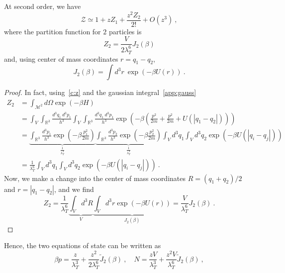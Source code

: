     At second order, we have 
    \begin{equation*}
        \mathcal Z \simeq 1 + z Z_1 + \frac{z^2 Z_2}{2!} + O(z^3) ~,
    \end{equation*}
    where the partition function for $2$ particles is 
    \begin{equation*}
        Z_2 = \frac{V}{2 \lambda_T^6} J_2 (\beta) 
    \end{equation*}
    and, using center of mass coordinates $r = q_1 - q_2$,
    \begin{equation*}
        J_2 (\beta) = \int d^3 r ~ \exp(- \beta U(r)) ~.
    \end{equation*}
    \begin{proof}
        In fact, using~\eqref{c:z} and the gaussian integral~\eqref{app:gauss}
        \begin{equation*}
        \begin{aligned}
            Z_2 & = \int_{\mathcal M^2} d \Omega \exp(- \beta H) \\ & = \int_V \int_{\mathbb R^3}\frac{d^3 q_1 ~ d^3 p_1}{h^3} \int_V \int_{\mathbb R^3}\frac{d^3 q_1 ~ d^3 p_1}{h^3} \exp(- \beta (\frac{p^2}{2m} + \frac{p^2}{2m} + U(|q_1 - q_2|))) \\ & = \underbrace{\int_{\mathbb R^3} \frac{d^3 p_1}{h^3} \exp(- \beta \frac{p_1^2}{2m})}_{\frac{1}{\lambda_T^3}} \underbrace{\int_{\mathbb R^3} \frac{d^3 p_2}{h^3} \exp(- \beta \frac{p_2^2}{2m})}_{\frac{1}{\lambda_T^3}} \int_V d^3 q_1 \int_V d^3 q_2 \exp(- \beta U(|q_i - q_j|)) \\ & = \frac{1}{\lambda_T^6} \int_V d^3 q_1 \int_V d^3 q_2 \exp(- \beta U(|q_i - q_j|)) ~.
        \end{aligned}
        \end{equation*}
        Now, we make a change into the center of mass coordinates $R = (q_1 + q_2)/2$ and $r = |q_1 - q_2|$, and we find
        \begin{equation*}
            Z_2 = \frac{1}{\lambda_T^6} \underbrace{\int_V d^3 R}_V \underbrace{\int_V d^3 r \exp(- \beta U(r)) }_{J_2 (\beta)} = \frac{V}{\lambda_T^6} J_2 (\beta) ~.
        \end{equation*}
    \end{proof}
    Hence, the two equations of state can be written as 
    \begin{equation*}
        \beta p = \frac{z}{\lambda_T^3} + \frac{z^2}{2 \lambda_T^6} \tilde J_2 (\beta) ~, \quad N = \frac{z V}{\lambda_T^3} + \frac{z^2 V }{\lambda_T^6} \tilde J_2 (\beta) ~,
    \end{equation*}
